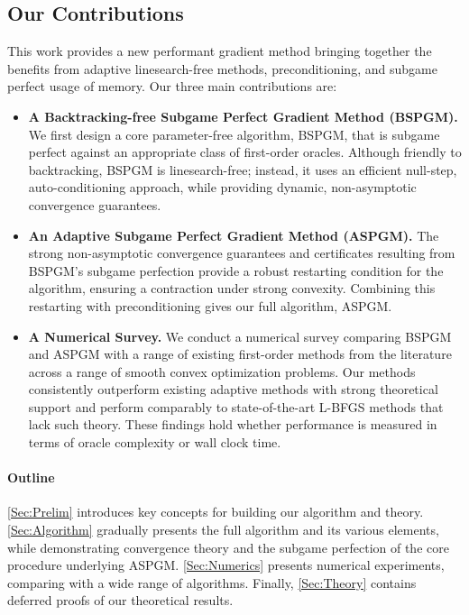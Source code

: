 \documentclass[11pt]{article}
\numberwithin{equation}{section}
\theoremstyle{definition}
\theoremstyle{plain}
\theoremstyle{definition}
\begin{document}
\subsection{Our Contributions}

This work provides a new performant gradient method bringing together the benefits from adaptive linesearch-free methods, preconditioning, and subgame perfect usage of memory. Our three main contributions are:
\begin{itemize}
    \item {\bf A Backtracking-free Subgame Perfect Gradient Method (BSPGM).} We first design a core parameter-free algorithm, BSPGM, that is subgame perfect against an appropriate class of first-order oracles. Although friendly to backtracking, BSPGM is linesearch-free; instead, it uses an efficient null-step, auto-conditioning approach, while providing dynamic, non-asymptotic convergence guarantees.
    \item {\bf An Adaptive Subgame Perfect Gradient Method (ASPGM).} The strong non-asymptotic convergence guarantees and certificates resulting from BSPGM's subgame perfection provide a robust restarting condition for the algorithm, ensuring a contraction under strong convexity. Combining this restarting with preconditioning gives our full algorithm, ASPGM.
    \item {\bf A Numerical Survey.} We conduct a numerical survey comparing BSPGM and ASPGM with a range of existing first-order methods from the literature across a range of smooth convex optimization problems. Our methods consistently outperform existing adaptive methods with strong theoretical support and perform comparably to state-of-the-art L-BFGS methods that lack such theory. These findings hold whether performance is measured in terms of oracle complexity or wall clock time. 
\end{itemize}


\paragraph{Outline}
\cref{Sec:Prelim} introduces key concepts for building our algorithm and theory. \cref{Sec:Algorithm} gradually presents the full algorithm and its various elements, while demonstrating convergence theory and the subgame perfection of the core procedure underlying ASPGM. \cref{Sec:Numerics} presents numerical experiments, comparing with a wide range of algorithms. Finally, \cref{Sec:Theory} contains deferred proofs of our theoretical results.
\end{document}
